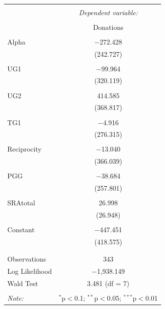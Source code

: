\documentclass[12pt]{article}
\begin{document}
\begin{table}[!htbp] \centering 
  \caption{} 
  \label{} 
\begin{tabular}{@{\extracolsep{5pt}}lc} 
\\[-1.8ex]\hline 
\hline \\[-1.8ex] 
 & \multicolumn{1}{c}{\textit{Dependent variable:}} \\ 
\cline{2-2} 
\\[-1.8ex] & Donations \\ 
\hline \\[-1.8ex] 
 Alpha & $-$272.428 \\ 
  & (242.727) \\ 
  & \\ 
 UG1 & $-$99.964 \\ 
  & (320.119) \\ 
  & \\ 
 UG2 & 414.585 \\ 
  & (368.817) \\ 
  & \\ 
 TG1 & $-$4.916 \\ 
  & (276.315) \\ 
  & \\ 
 Reciprocity & $-$13.040 \\ 
  & (366.039) \\ 
  & \\ 
 PGG & $-$38.684 \\ 
  & (257.801) \\ 
  & \\ 
 SRAtotal & 26.998 \\ 
  & (26.948) \\ 
  & \\ 
 Constant & $-$447.451 \\ 
  & (418.575) \\ 
  & \\ 
\hline \\[-1.8ex] 
Observations & 343 \\ 
Log Likelihood & $-$1,938.149 \\ 
Wald Test & 3.481 (df = 7) \\ 
\hline 
\hline \\[-1.8ex] 
\textit{Note:}  & \multicolumn{1}{r}{$^{*}$p$<$0.1; $^{**}$p$<$0.05; $^{***}$p$<$0.01} \\ 
\end{tabular} 
\end{table}
	
\end{document}

